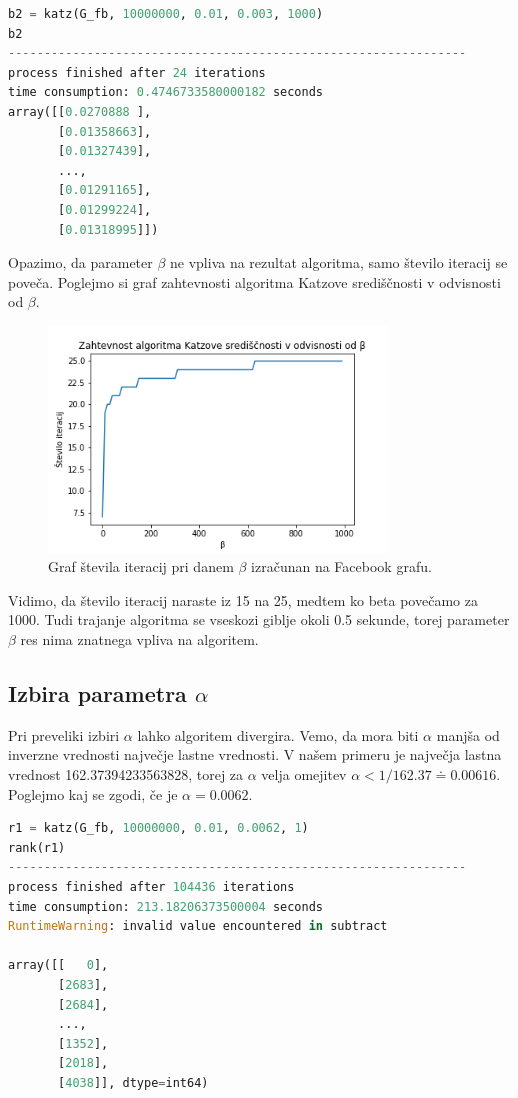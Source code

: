 \documentclass[a4paper]{article}
\begin{document}
\begin{lstlisting}[language=Python]
b2 = katz(G_fb, 10000000, 0.01, 0.003, 1000)
b2
----------------------------------------------------------------
process finished after 24 iterations
time consumption: 0.4746733580000182 seconds
array([[0.0270888 ],
       [0.01358663],
       [0.01327439],
       ...,
       [0.01291165],
       [0.01299224],
       [0.01318995]])
\end{lstlisting}

Opazimo, da parameter $\beta$ ne vpliva na rezultat algoritma, samo število iteracij se poveča. Poglejmo si graf zahtevnosti algoritma Katzove središčnosti v odvisnosti od $\beta.$

\begin{figure}[h]
\begin{center} 
\includegraphics[width=9cm]{Katz_beta.png}
\caption[Zahtevnost algoritma Katzove središčnosti glede na $\beta$]{Graf števila iteracij pri danem $\beta$ izračunan na Facebook grafu.}
\end{center}
\end{figure}

Vidimo, da število iteracij naraste iz 15 na 25, medtem ko beta povečamo za 1000. Tudi trajanje algoritma se vseskozi giblje okoli 0.5 sekunde, torej parameter $\beta$ res nima znatnega vpliva na algoritem.

\subsection{Izbira parametra $\alpha$}
Pri preveliki izbiri $\alpha$ lahko algoritem divergira. Vemo, da mora biti $\alpha$ manjša od inverzne vrednosti največje lastne vrednosti. V našem primeru je največja lastna vrednost 162.37394233563828, torej za $\alpha$ velja omejitev $\alpha < 1/162.37 \doteq 0.00616.$ Poglejmo kaj se zgodi, če je $\alpha = 0.0062.$

\begin{lstlisting}[language=Python]
r1 = katz(G_fb, 10000000, 0.01, 0.0062, 1)
rank(r1)
----------------------------------------------------------------
process finished after 104436 iterations
time consumption: 213.18206373500004 seconds
RuntimeWarning: invalid value encountered in subtract

array([[   0],
       [2683],
       [2684],
       ...,
       [1352],
       [2018],
       [4038]], dtype=int64)
\end{lstlisting}
\end{document}
